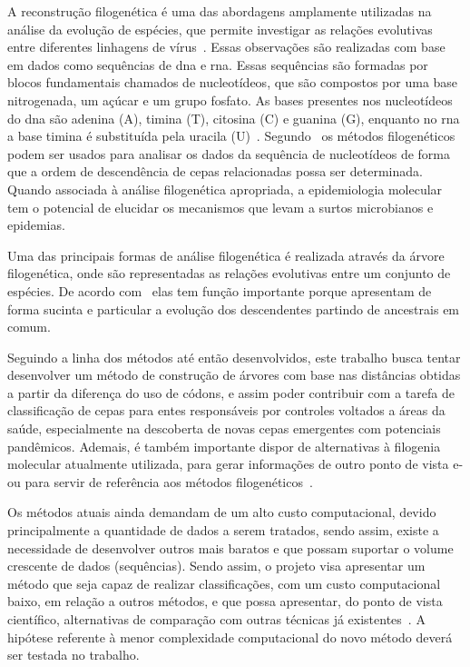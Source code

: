 A reconstrução filogenética é uma das abordagens amplamente utilizadas na análise da evolução de espécies, que permite investigar as relações evolutivas entre diferentes linhagens de vírus~\cite{sistematica_santos_2012, consideracoes_ribas_2006,dinossauros_santos_2008}. Essas observações são realizadas com base em dados como sequências de \gls{dna} e \gls{rna}. Essas sequências são formadas por blocos fundamentais chamados de nucleotídeos, que são compostos por uma base nitrogenada, um açúcar e um grupo fosfato. As bases presentes nos nucleotídeos do \gls{dna} são adenina (A), timina (T), citosina (C) e guanina (G), enquanto no \gls{rna} a base timina é substituída pela uracila (U)~\cite{alberts_molecular_2002,molecular_bernard_2022,genetica_peter_2017}.
Segundo~ os métodos filogenéticos podem ser usados para analisar os dados da sequência de nucleotídeos de forma que a ordem de descendência de cepas relacionadas possa ser determinada. Quando associada à análise filogenética apropriada, a epidemiologia molecular tem o potencial de elucidar os mecanismos que levam a surtos microbianos e epidemias.

Uma das principais formas de análise filogenética é realizada através da árvore filogenética, onde são representadas as relações evolutivas entre um conjunto de espécies. De acordo com~ elas tem função importante porque apresentam de forma sucinta e particular a evolução dos descendentes partindo de ancestrais em comum.

Seguindo a linha dos métodos até então desenvolvidos, este trabalho busca tentar desenvolver um método de construção de árvores com base nas distâncias obtidas a partir da diferença do uso de códons, e assim poder contribuir com a tarefa de classificação de cepas para entes responsáveis por controles voltados a áreas da saúde, especialmente na descoberta de novas cepas emergentes com potenciais pandêmicos. Ademais, é também importante dispor de alternativas à filogenia molecular atualmente utilizada, para gerar informações de outro ponto de vista e-ou para servir de referência aos métodos filogenéticos~\cite{virology_flint_2015}.

Os métodos atuais ainda demandam de um alto custo computacional, devido principalmente a quantidade de dados a serem tratados, sendo assim, existe a necessidade de desenvolver outros mais baratos e que possam suportar o volume crescente de dados (sequências).
Sendo assim, o projeto visa apresentar um método que seja capaz de realizar classificações, com um custo computacional baixo, em relação a outros métodos, e que possa apresentar, do ponto de vista científico, alternativas de comparação com outras técnicas já existentes~\cite{frank_chemistry_2017,gene_brow_2020}. A hipótese referente à menor complexidade computacional do novo método deverá ser testada no trabalho.

